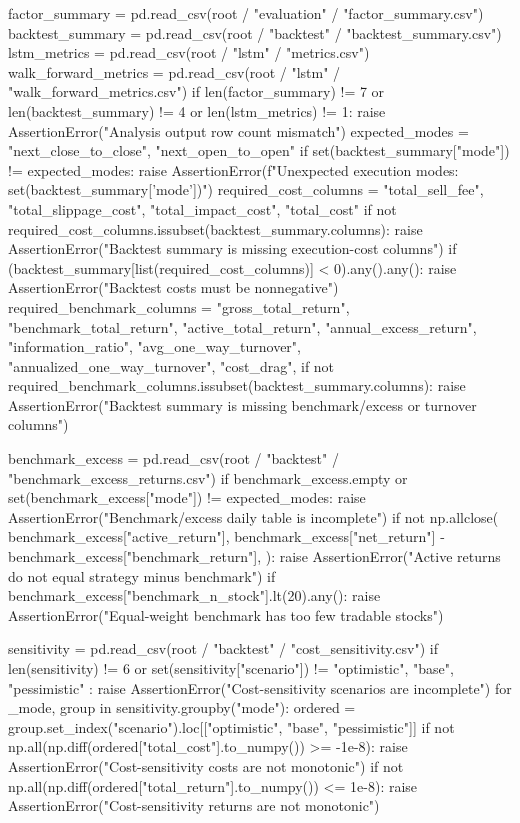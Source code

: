 \documentclass[UTF8,a4paper,fontset=fandol]{ctexart}
\begin{document}
\begin{ProjectCode}
    factor_summary = pd.read_csv(root / "evaluation" / "factor_summary.csv")
    backtest_summary = pd.read_csv(root / "backtest" / "backtest_summary.csv")
    lstm_metrics = pd.read_csv(root / "lstm" / "metrics.csv")
    walk_forward_metrics = pd.read_csv(root / "lstm" / "walk_forward_metrics.csv")
    if len(factor_summary) != 7 or len(backtest_summary) != 4 or len(lstm_metrics) != 1:
        raise AssertionError("Analysis output row count mismatch")
    expected_modes = {"next_close_to_close", "next_open_to_open"}
    if set(backtest_summary["mode"]) != expected_modes:
        raise AssertionError(f"Unexpected execution modes: {set(backtest_summary['mode'])}")
    required_cost_columns = {
        "total_sell_fee", "total_slippage_cost", "total_impact_cost", "total_cost"
    }
    if not required_cost_columns.issubset(backtest_summary.columns):
        raise AssertionError("Backtest summary is missing execution-cost columns")
    if (backtest_summary[list(required_cost_columns)] < 0).any().any():
        raise AssertionError("Backtest costs must be nonnegative")
    required_benchmark_columns = {
        "gross_total_return",
        "benchmark_total_return",
        "active_total_return",
        "annual_excess_return",
        "information_ratio",
        "avg_one_way_turnover",
        "annualized_one_way_turnover",
        "cost_drag",
    }
    if not required_benchmark_columns.issubset(backtest_summary.columns):
        raise AssertionError("Backtest summary is missing benchmark/excess or turnover columns")

    benchmark_excess = pd.read_csv(root / "backtest" / "benchmark_excess_returns.csv")
    if benchmark_excess.empty or set(benchmark_excess["mode"]) != expected_modes:
        raise AssertionError("Benchmark/excess daily table is incomplete")
    if not np.allclose(
        benchmark_excess["active_return"],
        benchmark_excess["net_return"] - benchmark_excess["benchmark_return"],
    ):
        raise AssertionError("Active returns do not equal strategy minus benchmark")
    if benchmark_excess["benchmark_n_stock"].lt(20).any():
        raise AssertionError("Equal-weight benchmark has too few tradable stocks")

    sensitivity = pd.read_csv(root / "backtest" / "cost_sensitivity.csv")
    if len(sensitivity) != 6 or set(sensitivity["scenario"]) != {
        "optimistic", "base", "pessimistic"
    }:
        raise AssertionError("Cost-sensitivity scenarios are incomplete")
    for _mode, group in sensitivity.groupby("mode"):
        ordered = group.set_index("scenario").loc[["optimistic", "base", "pessimistic"]]
        if not np.all(np.diff(ordered["total_cost"].to_numpy()) >= -1e-8):
            raise AssertionError("Cost-sensitivity costs are not monotonic")
        if not np.all(np.diff(ordered["total_return"].to_numpy()) <= 1e-8):
            raise AssertionError("Cost-sensitivity returns are not monotonic")


\end{ProjectCode}
\end{document}
